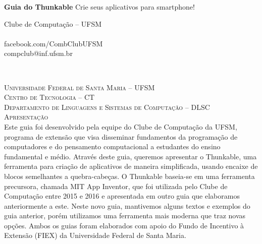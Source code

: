 \documentclass[11pt,fleqn]{book} %
\begin{document}
\thispagestyle{plain} %
\mbox{}
\newpage

\begingroup
\thispagestyle{empty}
\centering
\vspace*{5cm}
\par\normalfont\fontsize{35}{35}\sffamily\selectfont

\textbf{Guia do Thunkable}
{\LARGE Crie seus aplicativos para smartphone!}\par %
\vspace*{1cm}
{\Large Clube de Computação -- UFSM\\~ \\
facebook.com/CombClubUFSM\\
compclub@inf.ufsm.br\\}%
\endgroup

\setlength\parindent{0pt}
\setlength{\parskip}{11pt}

\newpage
~\vfill
\thispagestyle{empty}


\noindent \textsc{Universidade Federal de Santa Maria -- UFSM\\
 Centro de Tecnologia -- CT\\ Departamento de Linguagens e Sistemas de Computação -- DLSC}\\

\noindent \textsc{Apresentação}\\ %

\noindent Este guia foi desenvolvido pela equipe do Clube de Computação da UFSM, programa de extensão que visa disseminar fundamentos da programação de computadores e do pensamento computacional a estudantes do ensino fundamental e médio. Através deste guia, queremos apresentar o Thunkable, uma ferramenta para criação de aplicativos de maneira simplificada, usando encaixe de blocos semelhantes a quebra-cabeças. O Thunkable baseia-se em uma ferramenta precursora, chamada MIT App Inventor, que foi utilizada pelo Clube de Computação entre 2015 e 2016 e apresentada em outro guia que elaboramos anteriormente a este. Neste novo guia, mantivemos alguns textos e exemplos do guia anterior, porém utilizamos uma ferramenta mais moderna que traz novas opções. Ambos os guias foram elaborados com apoio do Fundo de Incentivo à Extensão (FIEX) da Universidade Federal de Santa Maria.
\\ %
\end{document}
